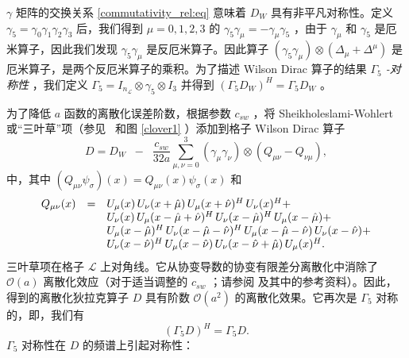 \documentclass{siamltex}
\begin{document}
$\gamma$    矩阵的交换关系    \eqref{commutativity_rel:eq}    意味着    $D_W$    具有非平凡对称性。定义    $\gamma_5 = \gamma_0\gamma_1\gamma_2\gamma_3$    后，我们得到    $\mu=0,1,2,3$    的    $\gamma_5 \gamma_\mu = - \gamma_\mu \gamma_5$    ，由于    $\gamma_\mu$    和    $\gamma_5$    是厄米算子，因此我们发现    $\gamma_5 \gamma_\mu$    是反厄米算子。因此算子    $(\gamma_5 \gamma_\mu) \otimes ( \Delta_\mu + \Delta^\mu)$    是厄米算子，是两个反厄米算子的乘积。为了描述 Wilson Dirac 算子的结果  {    \em       $\Gamma_5$   -对称性   }  ，我们定义    $\Gamma_5 = I_{n_{\mathcal{L}}} \otimes \gamma_5 \otimes I_3 $    并得到    $(\Gamma_5 D_W)^H = \Gamma_5 D_W$    。

为了降低    $a$    函数的离散化误差阶数，根据参数    $c_{sw}$    ，将 Sheik\-ho\-les\-la\-mi-Woh\-lert 或“三叶草”项（参见~    \cite{Sheikholeslami:1985ij}    和图    \ref{clover1}    ）添加到格子 Wilson Dirac 算子
\begin{equation} \label{eq:lattice_WD}
  D = D_W \;\; - \;\; \frac{c_{sw}}{32a} \sum_{\mu,\nu=0}^3 ( \gamma_\mu \gamma_\nu ) \otimes ( Q_{\mu\nu} - Q_{\nu\mu} ),
\end{equation}    中，其中    $\left(Q_{\mu\nu}\psi_\sigma\right)(x) = Q_{\mu\nu}(x) \psi_\sigma(x)$    和
$$
  \begin{array}[h]{rcl}
    Q_{\mu\nu}(x) & = & U_{\mu}(x) \, U_{\nu}(x+\hat\mu) \, U_{\mu}(x+\hat\nu)^{H} \, U_{\nu}(x)^{H} +                                   \\
                  &   & U_{\nu}(x) \, U_{\mu}(x-\hat\mu+\hat\nu)^{H} \, U_{\nu}(x-\hat\mu)^{H} \, U_{ \mu}(x-\hat\mu) +                  \\
                  &   & U_{\mu}(x-\hat\mu)^{H} \, U_{\nu}(x-\hat\mu-\hat\nu)^{H} \, U_{ \mu}(x-\hat\mu-\hat\nu) \, U_{ \nu}(x-\hat\nu) + \\
                  &   & U_{\nu}(x-\hat\nu)^{H} \, U_{\mu}(x-\hat\nu) \, U_{ \nu}(x-\hat\nu+\hat\mu) \, U_{\mu}(x)^{H}.                   \\
  \end{array}
$$    三叶草项在格子    $\mathcal{L}$    上对角线。它从协变导数的协变有限差分离散化中消除了    $\mathcal{O}(a)$    离散化效应（对于适当调整的    $c_{\mathit{sw}}$    ；请参阅    \cite{Sheikholeslami:1985ij}    及其中的参考资料）。因此，得到的离散化狄拉克算子    $D$    具有阶数    $\mathcal{O}(a^2)$    的离散化效果。它再次是    $\Gamma_5$    对称的，即，我们有
\begin{equation} \label{eq:g5sym}
  (\Gamma_5 D)^H = \Gamma_5 D.
\end{equation}       $\Gamma_5$    对称性在    $D$    的频谱上引起对称性：
\end{document}
